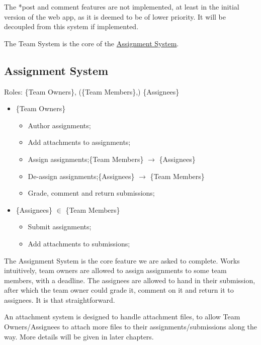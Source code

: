 \documentclass[12pt]{report}
\begin{document}
The *post and comment features are not implemented, at least in the initial version of the web app,
as it is deemed to be of lower priority. It will be decoupled from this system if implemented.
\vspace{1 em}

The Team System is the core of the \hyperref[overview.project-objectives.assignment-system]{Assignment System}.

\newpage
\subsection{Assignment System} \label{overview.project-objectives.assignment-system}

Roles: \{Team Owners\}, (\{Team Members\},) \{Assignees\}

\begin{itemize}
	\item \{Team Owners\}
	      \begin{itemize}
		      \item Author assignments;
		      \item Add attachments to assignments;
		      \item Assign assignments;\null\hfill \{Team Members\} $\rightarrow$ \{Assignees\}
		      \item De-assign assignments;\null\hfill \{Assignees\} $\rightarrow$ \{Team Members\}
		      \item Grade, comment and return submissions;
	      \end{itemize}
	\item \{Assignees\} $\in$ \{Team Members\}
	      \begin{itemize}
		      \item Submit assignments;
		      \item Add attachments to submissions;
	      \end{itemize}
\end{itemize}

The Assignment System is the core feature we are asked to complete.
Works intuitively, team owners are allowed to assign assignments to some team members, with a deadline.
The assignees are allowed to hand in their submission,
after which the team owner could grade it, comment on it and return it to assignees.
It is that straightforward.
\vspace{1 em}

An attachment system is designed to handle attachment files, to allow Team Owners/Assignees
to attach more files to their assignments/submissions along the way.
More details will be given in later chapters.
\end{document}
